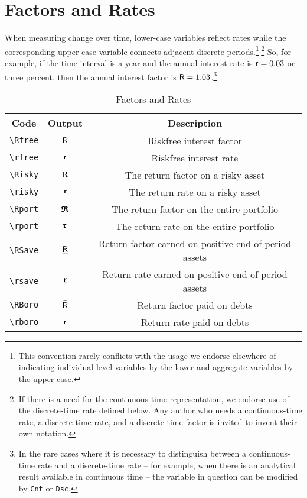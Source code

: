 \documentclass[12pt]{econtex}
\begin{document}
\section{Factors and Rates}
  When measuring change over time, lower-case variables reflect rates
  while the corresponding upper-case variable connects adjacent discrete periods.\footnote{This
  convention rarely conflicts with the usage we endorse elsewhere of
  indicating individual-level variables by the lower and aggregate
  variables by the upper case.}$^{,}$\footnote{If there is a need for the continuous-time 
representation, we endorse use of the discrete-time rate defined below.  Any
author who needs a continuous-time rate, a discrete-time rate, and a discrete-time factor
is invited to invent their own notation.}  So, for example, if the time interval is a year and the annual interest rate is $\mathsf{r}=0.03$ or three percent, then 
the annual interest factor is $\mathsf{R}=1.03$.\footnote{In the rare cases where it is necessary to distinguish between a continuous-time rate and a discrete-time rate -- for example, when there is an analytical result available in continuous time -- the variable in question can be modified by \texttt{Cnt} or \texttt{Dsc}.}


\begin{table}[h]
	\centering
	\begin{tabular}{|ccc|} 		
		\hline
Code    & Output & Description 
\\ \hline 
   \verb|\Rfree| & $\mathsf{R}$     & Riskfree interest factor
\\ \verb|\rfree| & $\mathsf{r}$     & Riskfree interest rate
\\ \verb|\Risky| & $\mathbf{R}$     & The return factor on a risky asset
\\ \verb|\risky| & $\mathbf{r}$     & The return rate on a risky asset
\\ \verb|\Rport| & $\pmb{\mathfrak{R}}$     & The return factor on the entire portfolio
\\ \verb|\rport| & $\pmb{\mathfrak{r}}$     & The return rate on the entire portfolio
\\ \verb|\RSave| & $\underline{\mathsf{R}}$     & Return factor earned on positive end-of-period assets
\\ \verb|\rsave| & $\underline{\mathsf{r}}$     & Return rate earned on positive end-of-period assets
\\ \verb|\RBoro| & $\bar{\mathsf{R}}$     & Return factor paid on debts
\\ \verb|\rboro| & $\bar{\mathsf{r}}$     & Return rate paid on debts 
\\	\hline
	\end{tabular}
	\caption{Factors and Rates}
	\label{table:Factors}
\end{table}	
\end{document}
